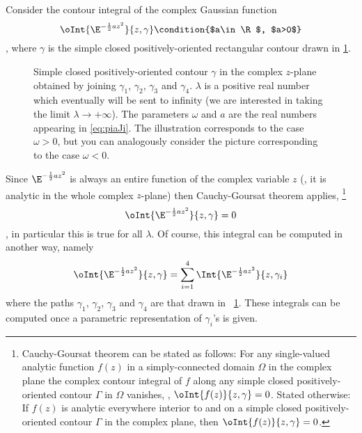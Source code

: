 Consider  the contour integral of the complex Gaussian function
\begin{dmath*}%
   \oInt{\E^{-\frac{1}{2}az^{2}}}{z, \gamma} \condition{$a\in \R$, $a>0$}
\end{dmath*},
where $\gamma$ is the simple closed positively-oriented rectangular contour drawn in
\cref{fig:gamma}.
\begin{figure}
\centering
{}
\caption{Simple closed positively-oriented contour $\gamma$ in the complex
   $z$-plane obtained by joining $\gamma_{1}$, $\gamma_{2}$, $\gamma_{3}$ and
   $\gamma_{4}$. $\lambda$ is a positive real number which eventually will be sent
   to infinity (we are interested in taking the limit
   $\lambda\rightarrow+\infty$).
   The parameters
   $\omega$ and $a$ are the real numbers appearing in \cref{eq:piaJi}. The
   illustration corresponds to the case $\omega>0$, but you can analogously
   consider the 
   picture corresponding to the case $\omega<0$. 
\label{fig:gamma}}
\end{figure}
Since $\E^{-\frac{1}{2}az^{2}}$ is always an entire function of the complex variable $z$ (\ie,
it is analytic in the whole complex $z$-plane) then 
Cauchy-Goursat theorem applies,%
\footnote{Cauchy-Goursat theorem can be stated as follows: 
For any single-valued
analytic function $f(z)$ in a simply-connected domain $\Omega$  in the complex
plane the complex contour integral of $f$ along any simple closed positively-oriented contour
$\Gamma$ in $\Omega$ vanishes, \ie, $\oInt{f(z) }{z,\gamma}= 0$. 
Stated otherwise: If $f(z)$  is analytic everywhere interior to and on a simple
closed positively-oriented contour $\Gamma$ in the complex plane, then
$\oInt{f(z)}{z,\gamma} =0 $.%
}
\begin{dmath}[label={int=0}]
   \oInt{\E^{-\frac{1}{2}az^{2}}}{z,\gamma}=0
\end{dmath},
in particular this is true for all $\lambda$.
Of course, this integral can be computed in another way,  namely
\begin{dmath}[label={int=sum4}]
   \oInt{\E^{-\frac{1}{2}az^{2}}}{z,\gamma} = \sum_{i=1}^{4} \Int{
      \E^{-\frac{1}{2}az^{2}}}{z,\gamma_{i}} 
\end{dmath}
where the paths $\gamma_{1}$, $\gamma_{2}$, $\gamma_{3}$ and $\gamma_{4}$ are
that drawn in \figurename~\ref{fig:gamma}.
These integrals can be computed once a parametric representation of
$\gamma_{i}$'s is given. 
